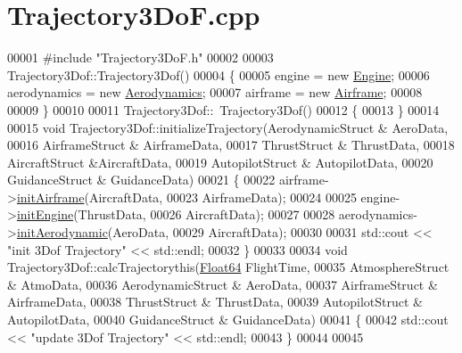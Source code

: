\hypertarget{_trajectory3_do_f_8cpp_source}{}\section{Trajectory3\+Do\+F.\+cpp}
\label{_trajectory3_do_f_8cpp_source}

\begin{DoxyCode}
00001 \textcolor{preprocessor}{#include "Trajectory3DoF.h"}
00002 
00003 Trajectory3Dof::Trajectory3Dof()
00004 \{
00005     engine = \textcolor{keyword}{new} \hyperlink{group___engine_class_engine}{Engine};
00006     aerodynamics = \textcolor{keyword}{new} \hyperlink{group___aerodynamic_class_aerodynamics}{Aerodynamics};
00007     airframe = \textcolor{keyword}{new} \hyperlink{group___airframe_class_airframe}{Airframe};
00008 
00009 \}
00010 
00011 Trajectory3Dof::~Trajectory3Dof()
00012 \{
00013 \}
00014 
00015 \textcolor{keywordtype}{void} Trajectory3Dof::initializeTrajectory(AerodynamicStruct & AeroData,
00016                                           AirframeStruct & AirframeData,
00017                                           ThrustStruct & ThrustData,
00018                                           AircraftStruct &AircraftData,
00019                                           AutopilotStruct & AutopilotData,
00020                                           GuidanceStruct & GuidanceData)
00021 \{
00022     airframe->\hyperlink{group___airframe_a57b5f7a74d11723186f34fc183e1581b}{initAirframe}(AircraftData, 
00023                            AirframeData);
00024 
00025     engine->\hyperlink{group___engine_aee607dba02101af5b299920f89b56e79}{initEngine}(ThrustData,
00026                        AircraftData);
00027 
00028     aerodynamics->\hyperlink{group___aerodynamic_aa4fee96e5b485cac47b3bc2127a6d4e2}{initAerodynamic}(AeroData,
00029                                   AircraftData);
00030 
00031     std::cout << \textcolor{stringliteral}{"init 3Dof Trajectory"} << std::endl;
00032 \}
00033 
00034 \textcolor{keywordtype}{void} Trajectory3Dof::calcTrajectorythis(\hyperlink{group___tools_ga3f1431cb9f76da10f59246d1d743dc2c}{Float64} FlightTime,  
00035                                         AtmosphereStruct & AtmoData, 
00036                                         AerodynamicStruct & AeroData,
00037                                         AirframeStruct & AirframeData, 
00038                                         ThrustStruct & ThrustData,
00039                                         AutopilotStruct & AutopilotData,
00040                                         GuidanceStruct & GuidanceData)
00041 \{
00042     std::cout << \textcolor{stringliteral}{"update 3Dof Trajectory"} << std::endl;
00043 \}
00044 
00045 
\end{DoxyCode}
